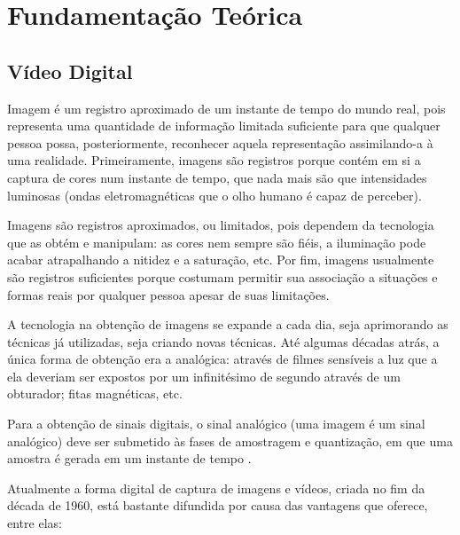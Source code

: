
\chapter{Fundamentação Teórica}



\section{Vídeo Digital}
Imagem é um registro aproximado de um instante de tempo do mundo real, pois representa uma quantidade de informação limitada suficiente para que qualquer pessoa possa, posteriormente, reconhecer aquela representação assimilando-a à uma realidade. Primeiramente, imagens são registros porque contém em si a captura de cores num instante de tempo, que nada mais são que intensidades luminosas (ondas eletromagnéticas que o olho humano é capaz de perceber).

Imagens são registros aproximados, ou limitados, pois dependem da tecnologia que as obtém e manipulam: as cores nem sempre são fiéis, a iluminação pode acabar atrapalhando a nitidez e a saturação, etc. Por fim, imagens usualmente são registros suficientes porque costumam permitir sua associação a situações e formas reais por qualquer pessoa apesar de suas limitações.

A tecnologia na obtenção de imagens se expande a cada dia, seja aprimorando as técnicas já utilizadas, seja criando novas técnicas. Até algumas décadas atrás, a única forma de obtenção era a analógica: através de filmes sensíveis a luz que a ela deveriam ser expostos por um infinitésimo de segundo através de um obturador; fitas magnéticas, etc.

Para a obtenção de sinais digitais, o sinal analógico (uma imagem é um sinal analógico) deve ser submetido às fases de amostragem e quantização, em que uma amostra é gerada em um instante de tempo \cite{rehme}.

Atualmente a forma digital de captura de imagens e vídeos, criada no fim da década de 1960, está bastante difundida por causa das vantagens que oferece, entre elas:

